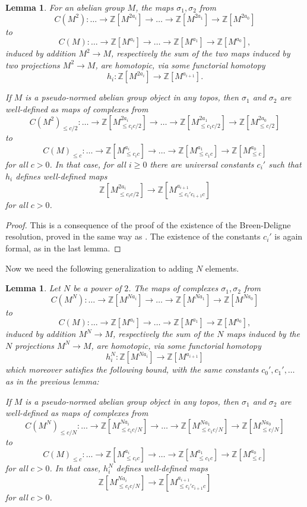 \documentclass[11pt]{amsbook}
\numberwithin{equation}{section}
\numberwithin{theorem}{section}
\newtheorem{lemma}[theorem]{Lemma}
\theoremstyle{definition}
\begin{document}
\begin{lemma}\label{lem:basehomotopy} For an abelian group $M$, the maps $\sigma_1,\sigma_2$ from
\[
C(M^2): \ldots \to \mathbb Z[M^{2a_i}]\to\ldots\to\mathbb Z[M^{2a_1}]\to\mathbb Z[M^{2a_0}]
\]
to
\[
C(M): \ldots \to \mathbb Z[M^{a_i}]\to\ldots\to\mathbb Z[M^{a_1}]\to\mathbb Z[M^{a_0}],
\]
induced by addition $M^2\to M$, respectively the sum of the two maps induced by two projections $M^2\to M$, are homotopic, via some functorial homotopy
\[
h_i: \mathbb Z[M^{2a_i}]\to \mathbb Z[M^{a_{i+1}}].
\]

If $M$ is a pseudo-normed abelian group object in any topos, then $\sigma_1$ and $\sigma_2$ are well-defined as maps of complexes from
\[
C(M^2)_{\leq c/2}: \ldots \to \mathbb Z[M^{2a_i}_{\leq c_ic/2}]\to\ldots\to\mathbb
Z[M^{2a_1}_{\leq c_1c/2}]\to\mathbb Z[M^{2a_0}_{\leq c/2}]
\]
to
\[
C(M)_{\leq c}: \ldots \to \mathbb Z[M^{a_i}_{\leq c_ic}]\to\ldots\to\mathbb
Z[M^{a_1}_{\leq c_1c}]\to\mathbb Z[M^{a_0}_{\leq c}]
\]
for all $c>0$. In that case, for all $i\geq 0$ there are universal constants $c_i'$ such that $h_i$ defines well-defined maps
\[
\mathbb Z[M^{2a_i}_{\leq c_ic/2}]\to \mathbb Z[M^{a_{i+1}}_{\leq
c_i'c_{i+1}c}]
\]
for all $c>0$.
\end{lemma}

\begin{proof} This is a consequence of the proof of the existence of the Breen-Deligne resolution, proved in the same way as \cite[Proposition 4.17]{Condensed}. The existence of the constants $c_i'$ is again formal, as in the last lemma.
\end{proof}

Now we need the following generalization to adding $N$ elements.

\begin{lemma}\label{lem:homotopyNelements} Let $N$ be a power of $2$. The maps of complexes $\sigma_1,\sigma_2$ from
\[
C(M^N): \ldots \to \mathbb Z[M^{Na_i}]\to\ldots\to\mathbb Z[M^{Na_1}]\to\mathbb Z[M^{Na_0}]
\]
to
\[
C(M): \ldots \to \mathbb Z[M^{a_i}]\to\ldots\to\mathbb Z[M^{a_1}]\to\mathbb Z[M^{a_0}],
\]
induced by addition $M^N\to M$, respectively the sum of the $N$ maps induced by the $N$ projections $M^N\to M$, are homotopic, via some functorial homotopy
\[
h_i^N: \mathbb Z[M^{Na_i}]\to \mathbb Z[M^{a_{i+1}}]
\]
which moreover satisfies the following bound, with the same constants $c_0',c_1',\ldots$ as in the previous lemma:

If $M$ is a pseudo-normed abelian group object in any topos, then $\sigma_1$ and $\sigma_2$ are well-defined as maps of complexes from
\[
C(M^N)_{\leq c/N}: \ldots \to \mathbb Z[M^{Na_i}_{\leq c_ic/N}]\to\ldots\to\mathbb Z[M^{Na_1}_{\leq c_1c/N}]\to\mathbb Z[M^{Na_0}_{\leq c/N}]
\]
to
\[
C(M)_{\leq c}: \ldots \to \mathbb Z[M^{a_i}_{\leq c_ic}]\to\ldots\to\mathbb Z[M^{a_1}_{\leq c_1c}]\to\mathbb Z[M^{a_0}_{\leq c}]
\]
for all $c>0$. In that case, $h_i^N$ defines well-defined maps
\[
\mathbb Z[M^{Na_i}_{\leq c_ic/N}]\to \mathbb Z[M^{a_{i+1}}_{\leq c_i'c_{i+1}c}]
\]
for all $c>0$.
\end{lemma}
\end{document}
